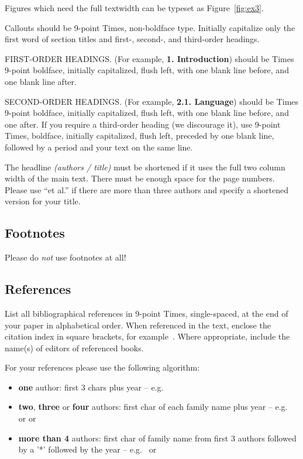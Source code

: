 \documentclass{egpubl}
\begin{document}
\noindent
Figures which need the full textwidth can be typeset as Figure~\ref{fig:ex3}.

\noindent Callouts should be 9-point Times, non-boldface type. Initially
capitalize only the first word of section titles and first-, second-, and
third-order headings.

FIRST-ORDER HEADINGS. (For example, \textbf{1. Introduction}) should be Times
9-point boldface, initially capitalized, flush left, with one blank line
before, and one blank line after.

SECOND-ORDER HEADINGS. (For example, \textbf{2.1. Language}) should be Times
9-point boldface, initially capitalized, flush left, with one blank line
before, and one after. If you require a third-order heading (we discourage
it), use 9-point Times, boldface, initially capitalized, flush left, preceded
by one blank line, followed by a period and your text on the same line.

The headline \emph{(authors / title)} must be shortened if it uses the full 
two column width of the main text.
There must be enough space for the page numbers. Please use ``et al.'' if 
there are more than three authors and specify a shortened version for your title.
\subsection{Footnotes}

Please do \emph{not} use footnotes at all!


\subsection{References}

List all bibliographical references in 9-point Times, single-spaced, at the
end of your paper in alphabetical order. When referenced in the text, enclose
the citation index in square brackets, for example~\cite{Lous90}. Where
appropriate, include the name(s) of editors of referenced books.

For your references please use the following algorithm:
\begin{itemize} 
\item \textbf{one} author: first 3 chars plus year -- 
      e.g.\ \cite{Lous90}
\item \textbf{two}, \textbf{three} or \textbf{four} authors: first char
      of each family name plus year --  e.g.\ \cite{Fellner-Helmberg93} 
      or \cite{Kobbelt97-USHDR} or \cite{Lafortune97-NARF}
\item \textbf{more than 4} authors: first char of family name from 
      first 3 authors followed by a '*' followed by the year -- 
      e.g.\ \cite{Buhmann:1998:DCQ} or \cite{FolDamFeiHug.etal93} 
\end{itemize}
\end{document}
